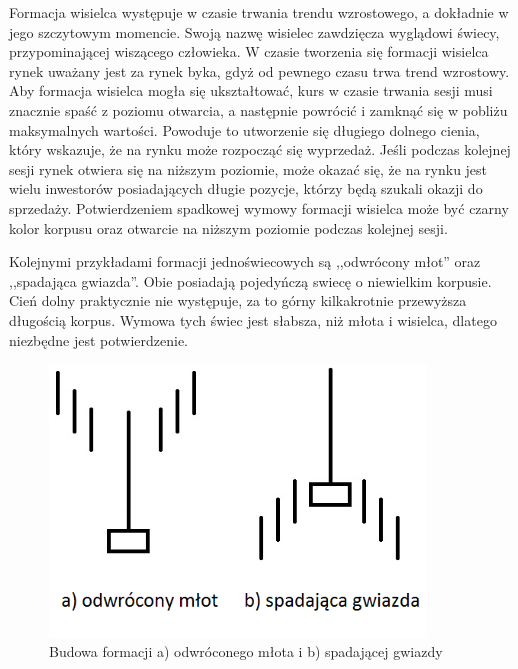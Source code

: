 \documentclass[pdflatex,11pt]{aghdpl}
\begin{document}
Formacja wisielca występuje w czasie trwania trendu wzrostowego, a dokładnie w jego szczytowym momencie. Swoją nazwę wisielec zawdzięcza wyglądowi świecy, przypominającej wiszącego człowieka. W czasie tworzenia się formacji wisielca rynek uważany jest za rynek byka, gdyż od pewnego czasu trwa trend wzrostowy. Aby formacja wisielca mogła się ukształtować, kurs w czasie trwania sesji musi znacznie spaść z poziomu otwarcia, a następnie powrócić i zamknąć się w pobliżu maksymalnych wartości. Powoduje to utworzenie się długiego dolnego cienia, który wskazuje, że na rynku może rozpocząć się wyprzedaż. Jeśli podczas kolejnej sesji rynek otwiera się na niższym poziomie, może okazać się, że na rynku jest wielu inwestorów posiadających długie pozycje, którzy będą szukali okazji do sprzedaży. Potwierdzeniem spadkowej wymowy formacji wisielca może być czarny kolor korpusu oraz otwarcie na niższym poziomie podczas kolejnej sesji.

Kolejnymi przykładami formacji jednoświecowych są ,,odwrócony młot'' oraz ,,spadająca gwiazda''. Obie posiadają pojedyńczą swiecę o niewielkim korpusie. Cień dolny praktycznie nie występuje, za to górny kilkakrotnie przewyższa długością korpus. Wymowa tych świec jest słabsza, niż młota i wisielca, dlatego niezbędne jest potwierdzenie.  
\begin{figure}[ht]
\begin{center}
\includegraphics[width=10cm]{invert_hammer.png}
\caption{Budowa formacji a) odwróconego młota i b) spadającej gwiazdy}
\label{odwr_mlot}
\end{center}
\end{figure} 
\end{document}
